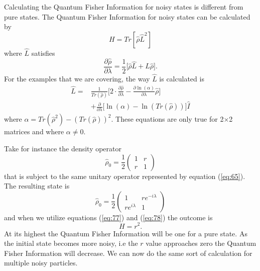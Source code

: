 \documentclass[twocolumn]{article}
\begin{document}
Calculating the Quantum Fisher Information for noisy states is different from pure states. The Quantum Fisher Information for noisy states can be calculated by
\begin{equation} \label{eq:77}
H=Tr[\hat{\rho}\hat{L}^2]
\end{equation}
where $\hat{L}$ satisfies
\begin{equation}\label{eq:78}
\frac{\partial\hat{\rho}}{\partial\lambda}=\frac{1}{2}\big[\hat{\rho}\hat{L}+\hat{L}\hat{\rho}\big].
\end{equation}
For the examples that we are covering, the way $\hat{L}$ is calculated is
\begin{align} \label{eq:79}
\hat{L}=&\frac{1}{Tr(\hat{\rho})}\Big[2\cdot\frac{\partial\hat{\rho}}{\partial\lambda}-\frac{\partial \ln(\alpha)}{\partial\lambda}\hat{\rho}\Big] \nonumber \\
&+\frac{\partial}{\partial\lambda}\Big[\ln(\alpha)-\ln(Tr(\hat{\rho}))\Big]\hat{I}
\end{align}
\cite{D. Collins} where $\alpha=Tr{(\hat{\rho}^2)}-(Tr(\hat{\rho}))^2$. These equations are only true for 2$\times$2 matrices and where $\alpha\neq 0$.

Take for instance the density operator
\begin{equation} \label{eq:80}
\hat{\rho}_0=\frac{1}{2}
\begin{pmatrix}
1 & r \\
r & 1
\end{pmatrix}
\end{equation}
that is subject to the same unitary operator represented by equation (\ref{eq:65}). The resulting state is
\begin{equation} \label{eq:81}
\hat{\rho}_0=\frac{1}{2}
\begin{pmatrix}
1 & re^{-i\lambda}\\
re^{i\lambda} & 1
\end{pmatrix}
\end{equation}
and when we utilize equations (\ref{eq:77}) and (\ref{eq:78}) the outcome is
\begin{equation} \label{eq:82}
H=r^2.
\end{equation}
At its highest the Quantum Fisher Information will be one for a pure state. As the initial state becomes more noisy, i.e the $r$ value approaches zero the Quantum Fisher Information will decrease.  We can now do the same sort of calculation for multiple noisy particles.
\end{document}
